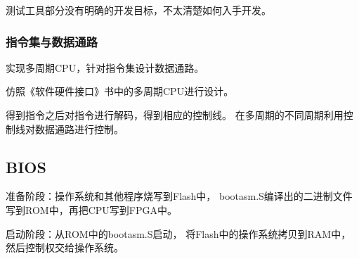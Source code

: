             测试工具部分没有明确的开发目标，不太清楚如何入手开发。

        \subsubsection{指令集与数据通路}
            实现多周期CPU，针对指令集设计数据通路。

            仿照《软件硬件接口》书中的多周期CPU进行设计。

            得到指令之后对指令进行解码，得到相应的控制线。%
            在多周期的不同周期利用控制线对数据通路进行控制。
    
    \subsection{BIOS}
        准备阶段：操作系统和其他程序烧写到Flash中，%
        bootasm.S编译出的二进制文件写到ROM中，再把CPU写到FPGA中。

        启动阶段：从ROM中的bootasm.S启动，%
        将Flash中的操作系统拷贝到RAM中，然后控制权交给操作系统。


